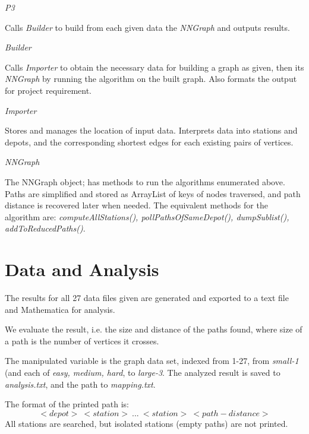 \documentclass[12pt]{article}  %
\begin{document}
\begin{enumerate}
	{\Large \item \emph{P3}}

	Calls \emph{Builder} to build from each given data the \emph{NNGraph} and outputs results.

	{\Large \item \emph{Builder}}

	Calls \emph{Importer} to obtain the necessary data for building a graph as given, then its \emph{NNGraph} by running the algorithm on the built graph. Also formats the output for project requirement.
	
	{\Large \item \emph{Importer}}

	Stores and manages the location of input data. Interprets data into stations and depots, and the corresponding shortest edges for each existing pairs of vertices.
	
	{\Large \item \emph{NNGraph}}

	The NNGraph object; has methods to run the algorithms enumerated above. Paths are simplified and stored as ArrayList of keys of nodes traversed, and path distance is recovered later when needed. The equivalent methods for the algorithm are: \emph{computeAllStations(), pollPathsOfSameDepot(), dumpSublist(), addToReducedPaths()}.


\end{enumerate}








\section{Data and Analysis}
The results for all 27 data files given are generated and exported to a text file and Mathematica for analysis.

We evaluate the result, i.e. the size and distance of the paths found, where size of a path is the number of vertices it crosses.

The manipulated variable is the graph data set, indexed from 1-27, from \emph{small-1} (and each of \emph{easy, medium, hard}, to \emph{large-3}.
The analyzed result is saved to \emph{analysis.txt}, and the path to \emph{mapping.txt}.

The format of the printed path is:
$$<depot> \ <station> \ ... \ <station> \ <path-distance>$$
All stations are searched, but isolated stations (empty paths) are not printed.
\end{document}
